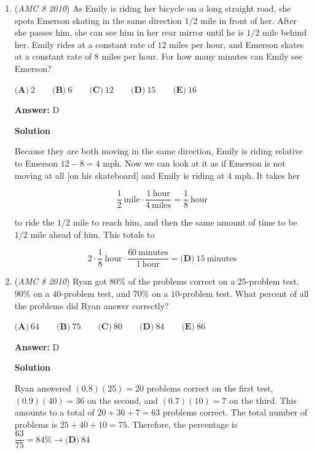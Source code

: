 \begin{enumerate}
To make any units digit, you can use 4 pennies and 1 nickel. Using 3 quarters, you can make 75, so you will need 2 more dimes. Therefore, you will need $\boxed{4 + 1 + 2 + 3 = B(10)}$ coins.

 


	\item (\textit{AMC 8 2010}) As Emily is riding her bicycle on a long straight road, she spots Emerson skating in the same direction $1/2$ mile in front of her. After she passes him, she can see him in her rear mirror until he is $1/2$ mile behind her. Emily rides at a constant rate of $12$ miles per hour, and Emerson skates at a constant rate of $8$ miles per hour. For how many minutes can Emily see Emerson?


 $\textbf{(A)}\ 2 \qquad\textbf{(B)}\ 6\qquad\textbf{(C)}\ 12\qquad\textbf{(D)}\ 15\qquad\textbf{(E)}\ 16$

 \textbf{Answer: }D



\textbf{Solution}

Because they are both moving in the same direction, Emily is riding relative to Emerson $12-8=4$ mph. Now we can look at it as if Emerson is not moving at all [on his skateboard] and Emily is riding at $4$ mph. It takes her

 
 \[\frac12 \ \text{mile} \cdot \frac{1\ \text{hour}}{4\ \text{miles}} = \frac18\ \text{hour}\]

 to ride the $1/2$ mile to reach him, and then the same amount of time to be $1/2$ mile ahead of him. This totals to

 
 \[2 \cdot \frac18 \ \text{hour} \cdot \frac{60\ \text{minutes}}{1\ \text{hour}} = \boxed{\textbf{(D)}\ 15}\ \text{minutes}\]



	\item (\textit{AMC 8 2010}) Ryan got $80\%$ of the problems correct on a $25$-problem test, $90\%$ on a $40$-problem test, and $70\%$ on a $10$-problem test. What percent of all the problems did Ryan answer correctly? 


 $\textbf{(A)}\ 64 \qquad\textbf{(B)}\ 75\qquad\textbf{(C)}\ 80\qquad\textbf{(D)}\ 84\qquad\textbf{(E)}\ 86$

 \textbf{Answer: }D



\textbf{Solution}

Ryan answered $(0.8)(25)=20$ problems correct on the first test, $(0.9)(40)=36$ on the second, and $(0.7)(10)=7$ on the third. This amounts to a total of $20+36+7=63$ problems correct. The total number of problems is $25+40+10=75.$ Therefore, the percentage is $\dfrac{63}{75} = 84\% \rightarrow \boxed{\textbf{(D)}\ 84}$




\end{enumerate}

